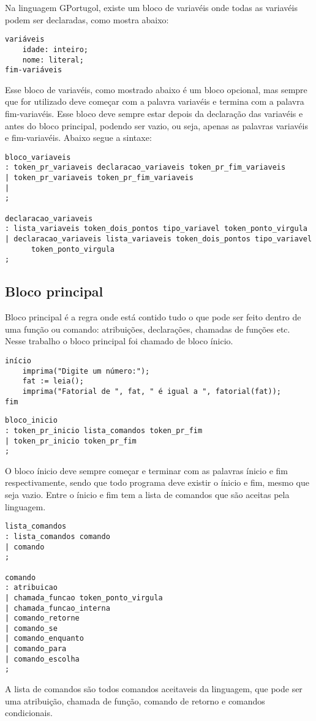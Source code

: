 \documentclass[a4paper,10pt]{article}
\begin{document}
Na linguagem GPortugol, existe um bloco de variavéis onde todas as variavéis podem ser declaradas, como mostra abaixo:
\begin{verbatim}
variáveis
    idade: inteiro;
    nome: literal;
fim-variáveis
\end{verbatim}

Esse bloco de variavéis, como mostrado abaixo é um bloco opcional, mas sempre que for utilizado deve começar com a palavra variavéis e termina com a palavra fim-variavéis. Esse bloco deve sempre estar depois da declaração das variavéis e antes do bloco principal, podendo ser vazio, ou seja, apenas as palavras variavéis e fim-variavéis. Abaixo segue a sintaxe:

\begin{verbatim}
bloco_variaveis
: token_pr_variaveis declaracao_variaveis token_pr_fim_variaveis
| token_pr_variaveis token_pr_fim_variaveis
|
;

declaracao_variaveis
: lista_variaveis token_dois_pontos tipo_variavel token_ponto_virgula
| declaracao_variaveis lista_variaveis token_dois_pontos tipo_variavel 
      token_ponto_virgula
;
\end{verbatim}

\subsection{Bloco principal}
Bloco principal é a regra onde está contido tudo o que pode ser feito dentro de uma função ou comando: atribuições, declarações, chamadas de funções etc. Nesse trabalho o bloco principal foi chamado de bloco ínicio.

\begin{verbatim}
início
    imprima("Digite um número:");
    fat := leia();
    imprima("Fatorial de ", fat, " é igual a ", fatorial(fat));
fim
\end{verbatim}


\begin{verbatim}
bloco_inicio
: token_pr_inicio lista_comandos token_pr_fim
| token_pr_inicio token_pr_fim
;
\end{verbatim}        
O bloco ínicio deve sempre começar e terminar com as palavras ínicio e fim respectivamente, sendo que todo programa deve existir o ínicio e fim, mesmo que seja vazio. Entre o ínicio e fim tem a lista de comandos que são aceitas pela linguagem.
\begin{verbatim}
lista_comandos
: lista_comandos comando
| comando
;

comando
: atribuicao
| chamada_funcao token_ponto_virgula
| chamada_funcao_interna
| comando_retorne
| comando_se
| comando_enquanto
| comando_para
| comando_escolha
;
\end{verbatim} 
A lista de comandos são todos comandos aceitaveis da linguagem, que pode ser uma atribuição, chamada de função, comando de retorno e comandos condicionais.
\end{document}
